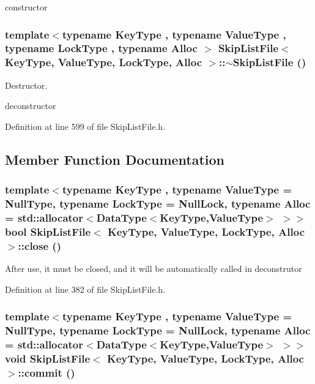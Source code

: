 constructor \hypertarget{classSkipListFile_d233c08a7814bff2e1e535de1414f799}{
\subsubsection[{$\sim$SkipListFile}]{\setlength{\rightskip}{0pt plus 5cm}template$<$typename KeyType , typename ValueType , typename LockType , typename Alloc $>$ {\bf SkipListFile}$<$ KeyType, ValueType, LockType, Alloc $>$::$\sim${\bf SkipListFile} ()}}
\label{classSkipListFile_d233c08a7814bff2e1e535de1414f799}


Destructor. 

deconstructor 

Definition at line 599 of file SkipListFile.h.

\subsection{Member Function Documentation}
\hypertarget{classSkipListFile_751dd7b2ee40cfb04a952131a3dec53d}{
\subsubsection[{close}]{\setlength{\rightskip}{0pt plus 5cm}template$<$typename KeyType , typename ValueType  = NullType, typename LockType  = NullLock, typename Alloc  = std::allocator$<$DataType$<$KeyType,ValueType$>$ $>$$>$ bool {\bf SkipListFile}$<$ KeyType, ValueType, LockType, Alloc $>$::close ()}}
\label{classSkipListFile_751dd7b2ee40cfb04a952131a3dec53d}


After use, it must be closed, and it will be automatically called in deconstrutor 

Definition at line 382 of file SkipListFile.h.\hypertarget{classSkipListFile_409e58415e91f6b4cbe9381fae50dc70}{
\subsubsection[{commit}]{\setlength{\rightskip}{0pt plus 5cm}template$<$typename KeyType , typename ValueType  = NullType, typename LockType  = NullLock, typename Alloc  = std::allocator$<$DataType$<$KeyType,ValueType$>$ $>$$>$ void {\bf SkipListFile}$<$ KeyType, ValueType, LockType, Alloc $>$::commit ()}}
\label{classSkipListFile_409e58415e91f6b4cbe9381fae50dc70}


